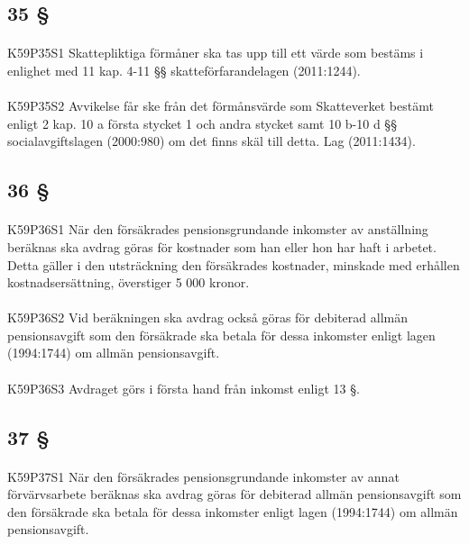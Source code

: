\documentclass[a4paper,notitlepage,openany,10pt]{book}
\begin{document}
\subsection*{35 §}
\paragraph*{}
{\tiny K59P35S1}
Skattepliktiga förmåner ska tas upp till ett värde som bestäms i enlighet med 11 kap. 4-11 §§ skatteförfarandelagen (2011:1244).
\paragraph*{}
{\tiny K59P35S2}
Avvikelse får ske från det förmånsvärde som Skatteverket bestämt enligt 2 kap. 10 a första stycket 1 och andra stycket samt 10 b-10 d §§ socialavgiftslagen (2000:980) om det finns skäl till detta.
Lag (2011:1434).
\subsection*{36 §}
\paragraph*{}
{\tiny K59P36S1}
När den försäkrades pensionsgrundande inkomster av anställning beräknas ska avdrag göras för kostnader som han eller hon har haft i arbetet. Detta gäller i den utsträckning den försäkrades kostnader, minskade med erhållen kostnadsersättning, överstiger 5 000 kronor.
\paragraph*{}
{\tiny K59P36S2}
Vid beräkningen ska avdrag också göras för debiterad allmän pensionsavgift som den försäkrade ska betala för dessa inkomster enligt lagen (1994:1744) om allmän pensionsavgift.
\paragraph*{}
{\tiny K59P36S3}
Avdraget görs i första hand från inkomst enligt 13 §.
\subsection*{37 §}
\paragraph*{}
{\tiny K59P37S1}
När den försäkrades pensionsgrundande inkomster av annat förvärvsarbete beräknas ska avdrag göras för debiterad allmän pensionsavgift som den försäkrade ska betala för dessa inkomster enligt lagen (1994:1744) om allmän pensionsavgift.
\end{document}
